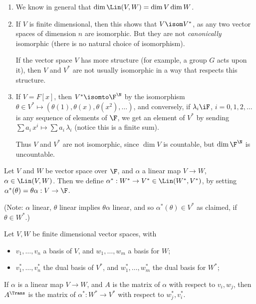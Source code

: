 \begin{remarks}
\mbox{}
\begin{enumerate}
	\item We know in general that $\dim \Lin(V,W)=\dim V \dim W$.
	\item If $V$ is finite dimensional, then this shows that $V\isom V^*$, as any two vector spaces of dimension $n$ are isomorphic. But they are not \emph{canonically} isomorphic (there is no natural choice of isomorphism). %
	
	If the vector space $V$ has more structure (for example, a group $G$ acts upon it), then $V$ and $V^*$ are not usually isomorphic in a way that respects this structure. %
	
	\item If $V=F[x]$, then $V^* \isomto \F^\N$ by the isomorphism $\theta\in V^* \mapsto (\theta(1),\theta(x),\theta(x^2),\ldots)$, and conversely, if $\lambda_i\iF$, $i=0,1,2,\ldots$ is any sequence of elements of $\F$,  we get an element of $V^*$ by sending $\sum a_i \, x^i \mapsto \sum a_i\,\lambda_i$ (notice this is a finite sum). %
	
	Thus $V$ and $V^*$ are not isomorphic, since $\dim V$ is countable, but $\dim \F^\N$ is uncountable.
\end{enumerate}
\end{remarks}

\begin{definition}
	Let $V$ and $W$ be vector space over $\F$, and $\alpha$ a linear map $V\to W$, $\alpha\in \Lin(V,W)$. Then we define $\alpha^*:W^*\to V^* \in \Lin(W^*,V^*)$, by setting $\alpha^*(\theta) = \theta\alpha:V\to\F$. %
	
	(Note: $\alpha$ linear, $\theta$ linear implies $\theta\alpha$ linear, and so $\alpha^*(\theta)\in V^*$ as claimed, if $\theta\in W^*$.) %
\end{definition}

\begin{lemma}
	Let $V,W$ be finite dimensional vector spaces, with %
	\begin{itemize}
		\shortskip
		\item [] $v_1,\ldots,v_n$ a basis of $V$, and $w_1,\ldots,w_m$ a basis for $W$;
		\item [] $v_1^*,\ldots,v_n^*$ the dual basis of $V^*$, and $w_1^*,\ldots,w_m^*$ the dual basis for $W^*$; %
	\end{itemize}
	If $\alpha$ is a linear map $V\to W$, and $A$ is the matrix of $\alpha$ with respect to $v_i,w_j$, then $A^\Trans$ is the matrix of $\alpha^*:W^*\to V^*$ with respect to $w_j^*,v_i^*$.
\end{lemma}

